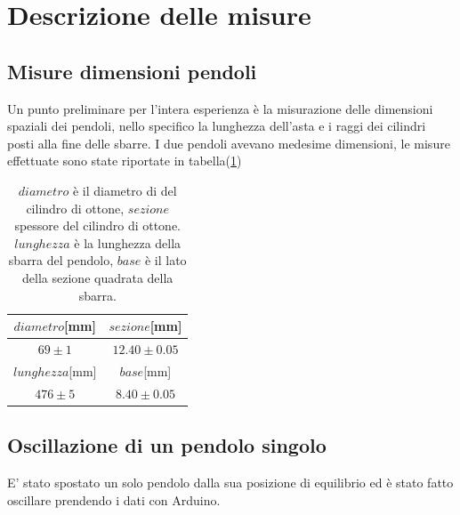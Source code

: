\documentclass{article}
\begin{document}
\section{Descrizione delle misure}
	       
		\subsection{ Misure dimensioni pendoli }
            Un punto preliminare per l'intera esperienza è la misurazione delle dimensioni spaziali dei pendoli, nello specifico la lunghezza dell'asta e i raggi dei cilindri posti alla fine delle sbarre.
            I due pendoli avevano medesime dimensioni, le misure effettuate sono state riportate in tabella(\ref{tab:dimensioni})

            

                \begin{table}[h!]
                    \centering
                            
                            \begin{tabular}{|c|c|}
                            \hline
                               $diametro$[mm]  & $sezione$[mm] \\
                            \hline

                               $69 \pm 1$ &  $12.40\pm0.05$\\
                            \hline
                            \hline

                               $lunghezza$[mm]  & $base$[mm] \\
                            \hline

                                $476\pm5$ & $8.40\pm0.05$ \\
                            \hline
                            \end{tabular}
                    \caption{$diametro$ è il diametro di del cilindro di ottone, $sezione$ spessore del cilindro di ottone. $lunghezza$ è la lunghezza della sbarra del pendolo, $base$ è il lato della sezione quadrata della sbarra.}
                    \label{tab:dimensioni}
                \end{table}

            
		\subsection{ Oscillazione di un pendolo singolo}
            E' stato spostato un solo pendolo dalla sua posizione di equilibrio ed è stato fatto oscillare prendendo i dati con Arduino.
\end{document}
